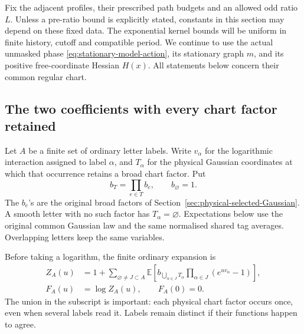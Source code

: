 \documentclass[11pt,reqno]{amsart}
\numberwithin{equation}{section}
\theoremstyle{definition}
\theoremstyle{remark}
\begin{document}
Fix the adjacent profiles, their prescribed path budgets and
an allowed odd ratio \(L\). Unless a pre-ratio bound is
explicitly stated, constants in this section may depend on
these fixed data. The exponential kernel bounds will be
uniform in finite history, cutoff and compatible period.
We continue to use the actual unmasked phase
\eqref{eq:stationary-model-action}, its stationary graph
\(m\), and its positive free-coordinate Hessian
\(H(x)\). All statements below concern their common
regular chart.

\subsection{The two coefficients with every chart factor retained}

Let \(A\) be a finite set of ordinary letter labels.
Write \(v_\alpha\) for the logarithmic interaction assigned
to label \(\alpha\), and \(T_\alpha\) for the physical
Gaussian coordinates at which that occurrence retains a
broad chart factor. Put
\[
                   b_T=\prod_{e\in T}b_e,\qquad b_\varnothing=1.
\]
The \(b_e\)'s are the original broad factors of
Section~\ref{sec:physical-selected-Gaussian}. A smooth letter
with no such factor has \(T_\alpha=\varnothing\).
Expectations below use the original common Gaussian law
and the same normalised shared tag averages. Overlapping
letters keep the same variables.

Before taking a logarithm, the finite ordinary expansion is
\begin{equation}
 \begin{split}
 Z_A(u)&=1+\sum_{\varnothing\ne J\subset A}
       \mathbb E\left[
         b_{\bigcup_{\alpha\in J}T_\alpha}
                     \prod_{\alpha\in J}(e^{uv_\alpha}-1)\right],\\
 F_A(u)&=\log Z_A(u),\qquad F_A(0)=0 .
 \end{split}
 \label{eq:matching-retained-partition}
\end{equation}
The union in the subscript is important: each physical chart
factor occurs once, even when several labels read it.
Labels remain distinct if their functions happen to agree.
\end{document}
